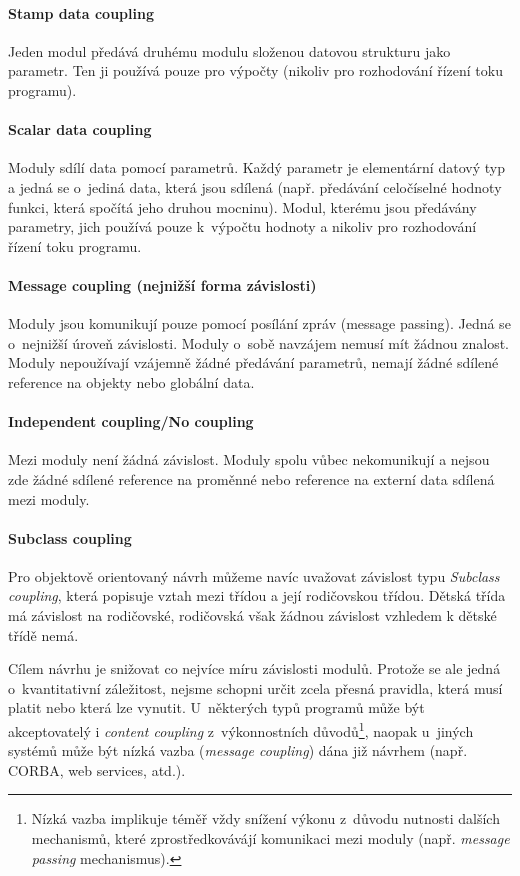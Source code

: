 \paragraph{Stamp data coupling} Jeden modul předává druhému modulu složenou datovou strukturu jako parametr. Ten ji používá pouze pro výpočty (nikoliv pro rozhodování řízení toku programu).

\paragraph{Scalar data coupling} Moduly sdílí data pomocí parametrů. Každý parametr je elementární datový typ a jedná se o~jediná data, která jsou sdílená (např. předávání celočíselné hodnoty funkci, která spočítá jeho druhou mocninu). Modul, kterému jsou předávány parametry, jich používá pouze k~výpočtu hodnoty a nikoliv pro rozhodování řízení toku programu.

\paragraph{Message coupling (nejnižší forma závislosti)} Moduly jsou komunikují pouze pomocí posílání zpráv (message passing). Jedná se o~nejnižší úroveň závislosti. Moduly o~sobě navzájem nemusí mít žádnou znalost. Moduly nepoužívají vzájemně žádné předávání parametrů, nemají žádné sdílené reference na objekty nebo globální data.

\paragraph{Independent coupling/No coupling} Mezi moduly není žádná závislost. Moduly spolu vůbec nekomunikují a nejsou zde žádné sdílené reference na proměnné nebo reference na externí data sdílená mezi moduly.

\vspace{0.5cm}

\paragraph{Subclass coupling} Pro objektově orientovaný návrh můžeme navíc uvažovat závislost typu \emph{Subclass coupling}, která popisuje vztah mezi třídou a její rodičovskou třídou. Dětská třída má závislost na rodičovské, rodičovská však žádnou závislost vzhledem k dětské třídě nemá.

\vspace{1.0cm}

Cílem návrhu je snižovat co nejvíce míru závislosti modulů. Protože se ale jedná o~kvantitativní záležitost, nejsme schopni určit zcela přesná pravidla, která musí platit nebo která lze vynutit. U~některých typů programů může být akceptovatelý i \emph{content coupling} z~výkonnostních důvodů\footnote{Nízká vazba implikuje téměř vždy snížení výkonu z~důvodu nutnosti dalších mechanismů, které zprostředkovávájí komunikaci mezi moduly (např. \emph{message passing} mechanismus).}, naopak u~jiných systémů může být nízká vazba (\emph{message coupling}) dána již návrhem (např. CORBA, web services, atd.).


